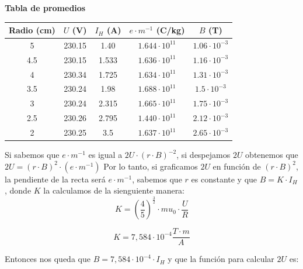 \documentclass[a4paper]{article}
\begin{document}
    \begin{center}
        \begin{minipage}[c]{7.5cm}
            \centering
            \textbf{Tabla de promedios}
            \vspace {2mm}
        \end{minipage}

        \begin{tabular}{ c c c c c }
            \toprule
            Radio (cm) & $U$ (V) & $I_H$ (A) & $e \cdot m^{-1}$ (C/kg) & $B$ (T)\\
            \midrule
            5 & 230.15 & 1.40 & $1.644 \cdot 10^{11}$ & $1.06 \cdot 10^{-3}$ \\
            4.5 & 230.15 & 1.533 & $1.636 \cdot 10^{11}$ & $1.16 \cdot 10^{-3}$ \\
            4 & 230.34 & 1.725 & $1.634 \cdot 10^{11}$ & $1.31 \cdot 10^{-3}$ \\
            3.5 & 230.24 & 1.98 & $1.688 \cdot 10^{11}$ & $1.5 \cdot 10^{-3}$ \\
            3 & 230.24 & 2.315 & $1.665 \cdot 10^{11}$ & $1.75 \cdot 10^{-3}$ \\
            2.5 & 230.26 & 2.795 & $1.440 \cdot 10^{11}$ & $2.12 \cdot 10^{-3}$ \\
            2 & 230.25 & 3.5 & $1.637 \cdot 10^{11}$ & $2.65 \cdot 10^{-3}$ \\
            \bottomrule
        \end{tabular}
    \end{center}

    \indent Si sabemos que $e \cdot m^{-1}$ es igual a $2U \cdot (r \cdot B)^{-2}$, si despejamos $2U$ obtenemos que $2U = (r \cdot B)^2 \cdot (e \cdot m^{-1}) $ Por lo tanto, si graficamos $2U$ en función de $(r \cdot B)^2$, la pendiente de la recta será $e \cdot m^{-1}$, sabemos que $r$ es constante y que $B = K \cdot I_H$, donde $K$ la calculamos de la sienguiente manera:\\

    \begin{equation}
        K = (\frac{4}{5})^{\frac{3}{2}} \cdot mu_{0} \cdot \frac{U}{R}
    \end{equation}
    
    \begin{equation}
        K = 7,584 \cdot 10^{-4} \frac{T \cdot m}{A} 
    \end{equation}

    \indent Entonces nos queda que $B = 7,584 \cdot 10^{-4} \cdot I_H$ y que la función para calcular $2U$ es:
\end{document}

